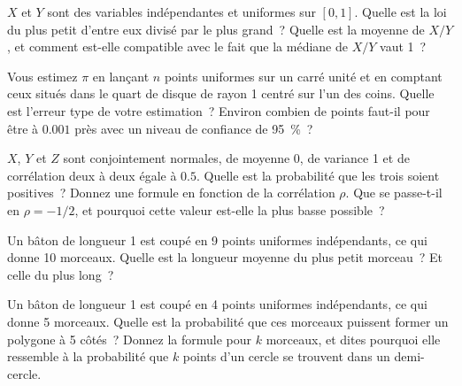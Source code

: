 \begin{question}\label{iq:iv1:continuous-and-geometric-probability:16}
$X$ et $Y$ sont des variables indépendantes et uniformes sur $[0, 1]$. Quelle est la loi du plus petit d'entre eux divisé par le plus grand~? Quelle est la moyenne de $X/Y$, et comment est-elle compatible avec le fait que la médiane de $X/Y$ vaut 1~?
\end{question}

\begin{question}\label{iq:iv1:continuous-and-geometric-probability:17}
Vous estimez $\pi$ en lançant $n$ points uniformes sur un carré unité et en comptant ceux situés dans le quart de disque de rayon 1 centré sur l'un des coins. Quelle est l'erreur type de votre estimation~? Environ combien de points faut-il pour être à $0.001$ près avec un niveau de confiance de 95~\%~?
\end{question}

\begin{question}\label{iq:iv1:continuous-and-geometric-probability:18}
$X$, $Y$ et $Z$ sont conjointement normales, de moyenne 0, de variance 1 et de corrélation deux à deux égale à $0.5$. Quelle est la probabilité que les trois soient positives~? Donnez une formule en fonction de la corrélation $\rho$. Que se passe-t-il en $\rho = -1/2$, et pourquoi cette valeur est-elle la plus basse possible~?
\end{question}

\begin{question}\label{iq:iv1:continuous-and-geometric-probability:19}
Un bâton de longueur 1 est coupé en 9 points uniformes indépendants, ce qui donne 10 morceaux. Quelle est la longueur moyenne du plus petit morceau~? Et celle du plus long~?
\end{question}

\begin{question}\label{iq:iv1:continuous-and-geometric-probability:20}
Un bâton de longueur 1 est coupé en 4 points uniformes indépendants, ce qui donne 5 morceaux. Quelle est la probabilité que ces morceaux puissent former un polygone à 5 côtés~? Donnez la formule pour $k$ morceaux, et dites pourquoi elle ressemble à la probabilité que $k$ points d'un cercle se trouvent dans un demi-cercle.
\end{question}

